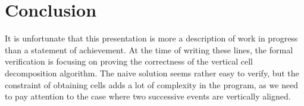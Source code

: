 \documentclass{easychair}
\begin{document}
\section{Conclusion}
It is unfortunate that this presentation is more a description of work
in progress than a statement of achievement.  At the time of writing
these lines, the formal verification
is focusing on proving the correctness of the vertical cell
decomposition algorithm.  The naive solution seems rather easy to
verify, but the constraint of obtaining cells adds a lot of complexity
in the program, as we need to pay attention to the case where two
successive events are vertically aligned.
\end{document}
